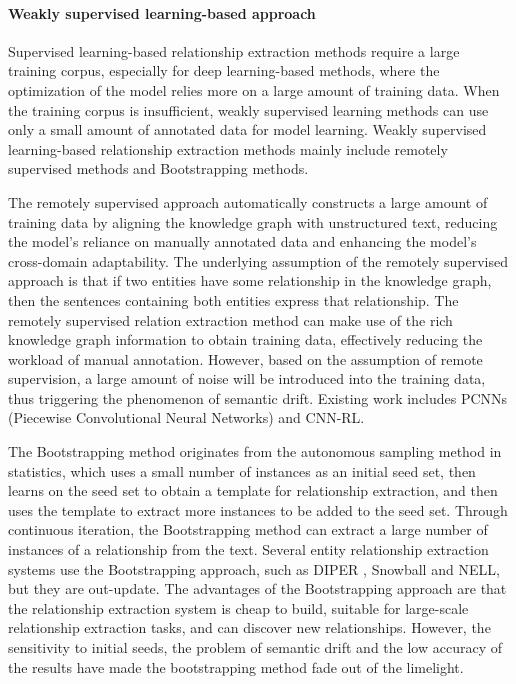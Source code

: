 \documentclass[%
 aip,
 jmp,%
 amsmath,amssymb,
 reprint,%
]{revtex4-2}
\begin{document}
\paragraph{Weakly supervised learning-based approach}
Supervised learning-based relationship extraction methods require a large training corpus, especially for deep learning-based methods, where the optimization of the model relies more on a large amount of training data. When the training corpus is insufficient, weakly supervised learning methods can use only a small amount of annotated data for model learning. Weakly supervised learning-based relationship extraction methods mainly include remotely supervised methods and Bootstrapping methods.

The remotely supervised approach automatically constructs a large amount of training data by aligning the knowledge graph with unstructured text, reducing the model's reliance on manually 
annotated data and enhancing the model's cross-domain adaptability. The underlying assumption of the remotely supervised approach is that if two entities have some relationship in the knowledge graph, then the sentences containing both entities express that relationship. The remotely supervised relation extraction method can make use of the rich knowledge graph information to obtain training data, effectively reducing the workload of manual annotation. However, based on the assumption of remote supervision, a large amount of noise will be introduced into the training data, thus triggering the phenomenon of semantic drift. Existing work includes PCNNs (Piecewise Convolutional Neural Networks) \cite{ji2008mixed} and CNN-RL\cite{wen2020new}.

The Bootstrapping method originates from the autonomous sampling method in statistics, 
which uses a small number of instances as an initial seed set, then learns on the seed set 
to obtain a template for relationship extraction, and then uses the template to extract more instances to be added to the seed set. Through continuous iteration, the Bootstrapping method can extract a large number of instances of a relationship from the text. Several entity relationship extraction systems use the Bootstrapping approach, such as DIPER \cite{gallet2015diuretic}, Snowball \cite{agichtein2000snowball} and NELL, but they are out-update. 
The advantages of the Bootstrapping approach are that the relationship extraction system is cheap to build, suitable for large-scale relationship extraction tasks, and can discover new relationships. 
However, the sensitivity to initial seeds, the problem of semantic drift and the low accuracy of the results have made the bootstrapping method fade out of the limelight.
\end{document}
